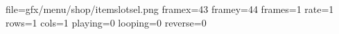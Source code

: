 file=gfx/menu/shop/itemslotsel.png
framex=43
framey=44
frames=1
rate=1
rows=1
cols=1
playing=0
looping=0
reverse=0

